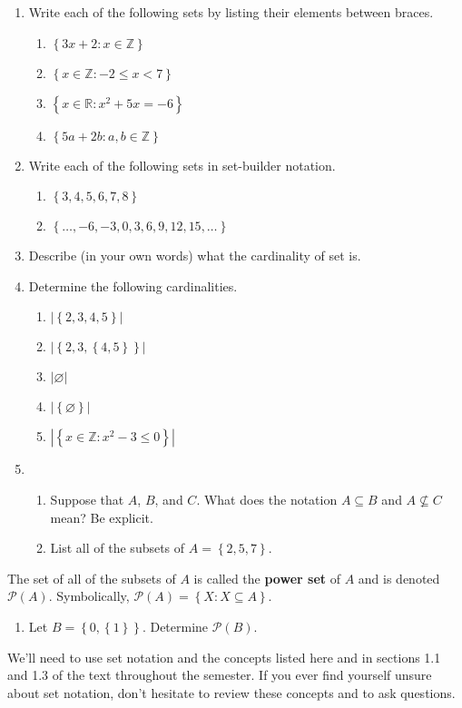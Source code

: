 \documentclass[12 pt]{article}
\newcommand{\R}{\mathbb{R}}
\newcommand{\Z}{\mathbb{Z}}
\newcommand{\set}[1]{\left\{#1\right\}}
\newcommand{\card}[1]{\left| #1 \right|}
\newcommand{\esub}{\subseteq}
\theoremstyle{definition}
\theoremstyle{plain}
\theoremstyle{mytheorem}
\theoremstyle{myexample}
\theoremstyle{mydefinition}
\begin{document}
\begin{enumerate}
\item Write each of the following sets by listing their elements between braces.	
	\begin{enumerate} \itemsep=.75in
	\item $\set{3x+2 : x \in \Z}$
	\item $\set{x \in \Z : -2 \leq x < 7}$
	\item $\set{x \in \R : x^2 + 5x = -6}$
	\item $\set{5a+2b : a,b \in \Z}$
	\vspace{.75in}
	\end{enumerate} 
	
\item Write each of the following sets in set-builder notation.
	\begin{enumerate} \itemsep=.75in
	\item $\set{3,4,5,6,7,8}$
	\item $\set{ \ldots, -6, -3, 0, 3, 6, 9, 12, 15, \ldots }$
	\vspace{.75in}
	\end{enumerate}
	
\item Describe (in your own words) what the cardinality of set is.

\vspace{.5in}
	
\item Determine the following cardinalities.
	\begin{enumerate} \itemsep=.75in
	\item $\card{\set{2,3,4,5}}$
	\item $\card{\set{2,3,\set{4,5}}}$
	\item $\card{\varnothing}$
	\item $\card{\set{\varnothing}}$
	\item $\card{\set{x \in \Z : x^2-3 \leq 0}}$
	\vspace{.75in}
	\end{enumerate}
	
\item \begin{enumerate}
	\item Suppose that $A$, $B$, and $C$.  What does the notation $A \esub B$ and $A \not\esub C$ mean?  Be explicit.
	\vspace{2in}
	\item List all of the subsets of $A=\set{2,5,7}$.
	
	\vspace{1in}
	
	\end{enumerate}
	\end{enumerate}
	The set of all of the subsets of $A$ is called the \textbf{power set} of $A$ and is denoted $\mathscr{P}(A)$.  Symbolically, $\mathscr{P}(A) = \set{X : X \esub A}$.\\
	\begin{enumerate}[resume]
	\item Let $B = \set{0,\set{1}}$.  Determine $\mathscr{P}(B)$.
	\vspace{1in}
	\end{enumerate}


We'll need to use set notation and the concepts listed here and in sections 1.1 and 1.3 of the text throughout the semester.  If you ever find yourself unsure about set notation, don't hesitate to review these concepts and to ask questions.
\end{document}
